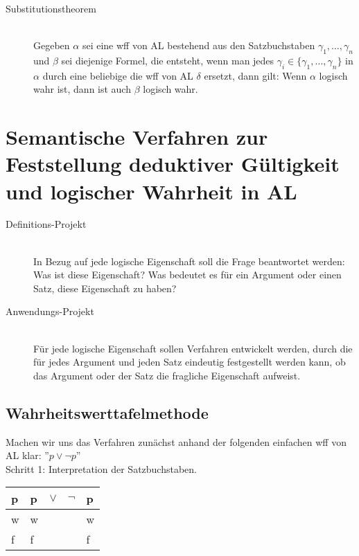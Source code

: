\documentclass{scrartcl}
\begin{document}
\begin{description}
	\item[Substitutionstheorem] \mbox{}\\ Gegeben $ \alpha $ sei eine wff von AL bestehend aus den Satzbuchstaben $ \gamma_1,\ldots,\gamma_n $ und $ \beta $ sei diejenige Formel, die entsteht, wenn man jedes $ \gamma_i \in \{ \gamma_1,\ldots,\gamma_n \} $ in $ \alpha $ durch eine beliebige die wff von AL $ \delta $ ersetzt, dann gilt: Wenn $ \alpha $ logisch wahr ist, dann ist auch $ \beta $ logisch wahr.
\end{description}

\section{Semantische Verfahren zur Feststellung deduktiver Gültigkeit und logischer Wahrheit in AL}

\begin{description}
	\item[Definitions-Projekt] \mbox{}\\ In Bezug auf jede logische Eigenschaft soll die Frage beantwortet werden: Was ist diese Eigenschaft? Was bedeutet es für ein Argument oder einen Satz, diese Eigenschaft zu haben?
\end{description}

\begin{description}
	\item[Anwendungs-Projekt] \mbox{}\\ Für jede logische Eigenschaft sollen Verfahren entwickelt werden, durch die für jedes Argument und jeden Satz eindeutig festgestellt werden kann, ob das Argument oder der Satz die fragliche Eigenschaft aufweist.
\end{description}

\subsection{Wahrheitswerttafelmethode}

Machen wir uns das Verfahren zunächst anhand der folgenden einfachen wff von AL klar: ''$ p \vee \neg p $'' \\

Schritt 1: Interpretation der Satzbuchstaben. \\

\begin{tabular}{|l|l l l l|}
	\hline
	p & p & $ \vee $ & $ \neg $ & p \\
	\hline
	w & w & & & w \\
	\hline
	f & f & & & f \\
	\hline
\end{tabular} \\
\end{document}
